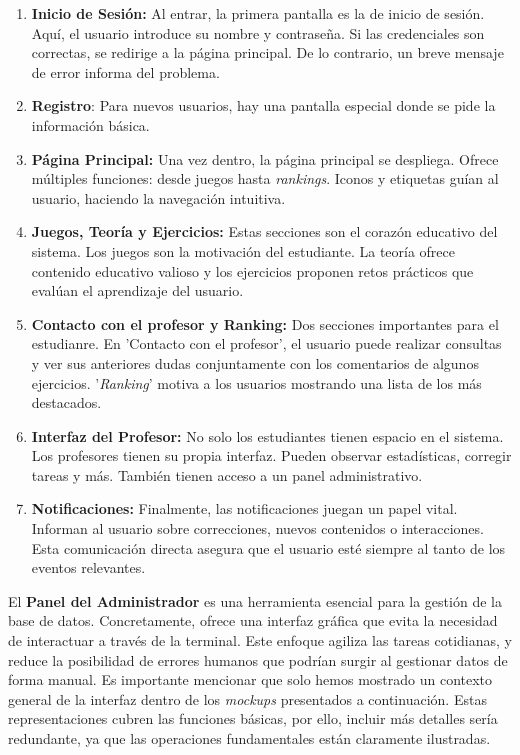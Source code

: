 \begin{enumerate}
    \item \textbf{Inicio de Sesión:} Al entrar, la primera pantalla es la de inicio de sesión. Aquí, el usuario introduce su nombre y contraseña. Si las credenciales son correctas, se redirige a la página principal. De lo contrario, un breve mensaje de error informa del problema.
    
    \item \textbf{Registro}: Para nuevos usuarios, hay una pantalla especial donde se pide la información básica.
    
    \item \textbf{Página Principal:} Una vez dentro, la página principal se despliega. Ofrece múltiples funciones: desde juegos hasta \textit{rankings}. Iconos y etiquetas guían al usuario, haciendo la navegación intuitiva.
    
    \item \textbf{Juegos, Teoría y Ejercicios:} Estas secciones son el corazón educativo del sistema. Los juegos son la motivación del estudiante. La teoría ofrece contenido educativo valioso y los ejercicios proponen retos prácticos que evalúan el aprendizaje del usuario.
    
    \item \textbf{Contacto con el profesor y Ranking:} Dos secciones importantes para el estudianre. En 'Contacto con el profesor', el usuario puede realizar consultas y ver sus anteriores dudas conjuntamente con los comentarios de algunos ejercicios. '\textit{Ranking}' motiva a los usuarios mostrando una lista de los más destacados.
    
    \item \textbf{Interfaz del Profesor:} No solo los estudiantes tienen espacio en el sistema. Los profesores tienen su propia interfaz. Pueden observar estadísticas, corregir tareas y más. También tienen acceso a un panel administrativo.
    
    \item \textbf{Notificaciones:} Finalmente, las notificaciones juegan un papel vital. Informan al usuario sobre correcciones, nuevos contenidos o interacciones. Esta comunicación directa asegura que el usuario esté siempre al tanto de los eventos relevantes.
\end{enumerate}

El \textbf{Panel del Administrador} es una herramienta esencial para la gestión de la base de datos. Concretamente, ofrece una interfaz gráfica que evita la necesidad de interactuar a través de la terminal. Este enfoque agiliza las tareas cotidianas, y reduce la posibilidad de errores humanos que podrían surgir al gestionar datos de forma manual. Es importante mencionar que solo hemos mostrado un contexto general de la interfaz dentro de los \textit{mockups} presentados a continuación. Estas representaciones cubren las funciones básicas, por ello, incluir más detalles sería redundante, ya que las operaciones fundamentales están claramente ilustradas.


